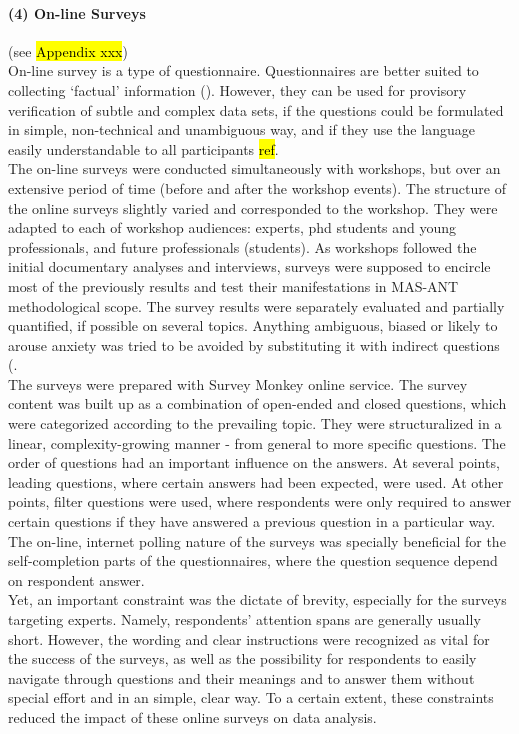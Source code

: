 \documentclass[11pt]{report}
\begin{document}
\paragraph{(4) On-line Surveys}
(see \hl{Appendix xxx})
\\
On-line survey is a type of questionnaire. Questionnaires  are  better  suited  to  collecting  ‘factual’ information (\cite{Payne and Payne 2004}). However, they can be used for provisory verification of subtle and complex data sets, if the questions could be formulated in simple, non-technical and unambiguous way, and if they use the language easily understandable to all participants \hl{ref}.
\\
The on-line surveys were conducted simultaneously with workshops, but over an extensive period of time (before and after the workshop events). The structure of the online surveys slightly varied and corresponded to the workshop. They were adapted to each of workshop audiences: experts, phd students and young professionals, and future professionals (students). As workshops followed the initial documentary analyses and interviews, surveys were supposed to encircle most of the previously results and test their manifestations in MAS-ANT methodological scope. The survey results were separately evaluated and partially quantified, if possible on several topics. Anything ambiguous, biased or likely to arouse anxiety was tried to be avoided by substituting it with indirect questions (\cite{Payne and Payne 2004}.
\\
The surveys were prepared with Survey Monkey online service. The survey content was built up as a combination of open-ended and closed questions, which were categorized according to the prevailing topic. They were structuralized in a linear, complexity-growing manner - from general to more specific questions. The order of questions had an important influence on the answers. At several points, leading questions, where certain answers had been expected, were used. At other points, filter questions were used, where respondents were only required to answer certain questions if they have answered a previous question in a particular way. The on-line, internet polling nature of the surveys was specially beneficial for the self-completion parts of the questionnaires, where the question sequence depend on respondent answer. 
\\
Yet, an important constraint was the dictate of brevity, especially for the surveys targeting experts. Namely, respondents’ attention spans are generally usually short. 
However, the wording and clear instructions were recognized as vital for the success of the surveys, as well as the possibility for respondents to easily navigate through questions and their meanings and to answer them without special effort and in an simple, clear way. To a certain extent, these constraints reduced the impact of these online surveys on data analysis.
\end{document}
